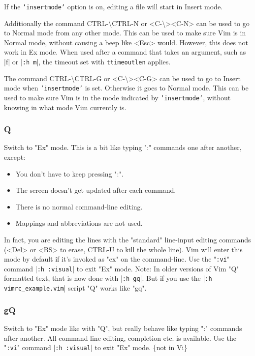 If the \texttt{'insertmode'} option is on, editing a file will start in Insert mode.

\label{CTRL-backslash_CTRL-N}
\label{i_CTRL-backslash_CTRL-N}
\label{c_CTRL-backslash_CTRL-N}
\label{v_CTRL-backslash_CTRL-N}
Additionally the command CTRL-\textbackslash CTRL-N or <C-\textbackslash><C-N> can be used to go to Normal mode from any other mode.
This can be used to make sure Vim is in Normal mode, without causing a beep like <Esc> would.
However, this does not work in Ex mode.
When used after a command that takes an argument, such as |f| or |\texttt{:h m}|, the timeout set with \texttt{ttimeoutlen} applies.

\label{CTRL-backslash_CTRL-G}
\label{i_CTRL-backslash_CTRL-G}
\label{c_CTRL-backslash_CTRL-G}
\label{v_CTRL-backslash_CTRL-G}
The command CTRL-\textbackslash CTRL-G or <C-\textbackslash><C-G> can be used to go to Insert mode when \texttt{'insertmode'} is set.
Otherwise it goes to Normal mode.
This can be used to make sure Vim is in the mode indicated by \texttt{'insertmode'}, without knowing in what mode Vim currently is.

\subsubsection{Q}
\label{Q}
\label{mode-Ex}
\label{Ex-mode}
\label{Ex}
\label{EX}
\label{E501}
Switch to "Ex" mode.
This is a bit like typing ":" commands one after another, except:
\begin{itemize}
				\item You don't have to keep pressing ":".
				\item The screen doesn't get updated after each command.
				\item There is no normal command-line editing.
				\item Mappings and abbreviations are not used.
\end{itemize}
In fact, you are editing the lines with the "standard" line-input editing commands (<Del> or <BS> to erase, CTRL-U to kill the whole line).
Vim will enter this mode by default if it's invoked as "ex" on the command-line.
Use the "\texttt{:vi}" command |\texttt{:h :visual}| to exit "Ex" mode.
Note: In older versions of Vim "Q" formatted text, that is now done with |\texttt{:h gq}|.
But if you use the
|\texttt{:h vimrc\_example.vim}| script "Q" works like "gq".

\subsubsection{gQ}
\label{gQ}
Switch to "Ex" mode like with "Q", but really behave like typing ":" commands after another.
All command line editing, completion etc. is available.
Use the "\texttt{:vi}" command |\texttt{:h :visual}| to exit "Ex" mode.
\{not in Vi\}

